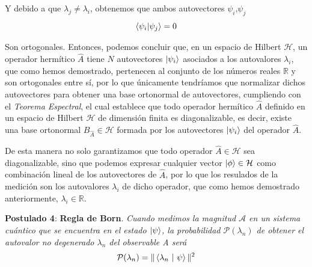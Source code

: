 \documentclass[12pt]{article}
\numberwithin{equation}{section} %
\begin{document}
    \vspace{1.5mm}

    Y debido a que \( \lambda_{j} \neq \lambda_{i} \), obtenemos que ambos autovectores \( \psi_{i} \text{,} \psi_{j} \)
    \begin{equation}
        \braket{\psi_{i} | \psi_{j}} = 0
    \end{equation}

    \vspace{1.5mm}

    Son ortogonales. Entonces, podemos concluir que, en un espacio de Hilbert \( \mathcal{H} \), un operador hermítico \( \hat{A} \) tiene \( N \) autovectores \( \ket{\psi_{i}} \) asociados a los autovalores \( \lambda_{i} \), que como hemos demostrado, pertenecen al conjunto de los números reales \( \mathbb{R} \) y son ortogonales entre sí, por lo que únicamente tendríamos que normalizar dichos autovectores para obtener una base ortonormal de autovectores, cumpliendo con el \textit{Teorema Espectral}, el cual establece que todo operador hermítico \( \hat{A} \) definido en un espacio de Hilbert \( \mathcal{H} \) de dimensión finita es diagonalizable, es decir, existe una base ortonormal \( B_{\hat{A}} \in \mathcal{H} \) formada por los autovectores \( \ket{\psi_{i}} \) del operador \( \hat{A} \).

    \vspace{5mm}
    
    De esta manera no solo garantizamos que todo operador \( \hat{A} \in \mathcal{H} \) sea diagonalizable, sino que podemos expresar cualquier vector \( \ket{\phi} \in \mathcal{H} \) como combinación lineal de los autovectores de \( \hat{A} \), por lo que los resulados de la medición son los autovalores \( \lambda_{i} \) de dicho operador, que como hemos demostrado anteriormente, \( \lambda_{i} \in \mathbb{R} \).

    \vspace{10mm}

    \textbf{Postulado 4}: \textbf{Regla de Born}. \textit{Cuando medimos la magnitud \( \mathcal{A} \) en un sistema
    cuántico que se encuentra en el estado \( \ket{\psi} \), la probabilidad \( \mathcal{P}(\lambda_{n})\) de obtener el
    autovalor no degenerado \( \lambda_{n}\) del observable A será}
    \begin{equation}
        \mathcal{P}(\lambda_{n}) = \| \braket{\lambda_{n} \ | \ \psi} \| ^{2}
        \label{eq: regla_born}
    \end{equation}
\end{document}
